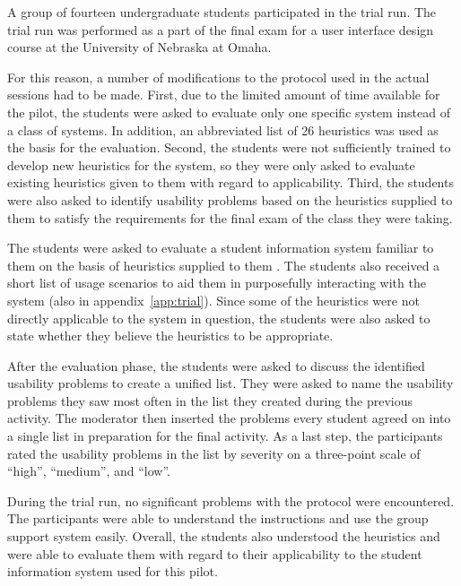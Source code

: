 A group of fourteen undergraduate students participated in the trial run. The trial run was performed as a part of the final exam for a user interface design course at the University of Nebraska at Omaha.

For this reason, a number of modifications to the protocol used in the actual sessions had to be made. First, due to the limited amount of time available for the pilot, the students were asked to evaluate only one specific system instead of a class of systems. In addition, an abbreviated list of 26 heuristics was used as the basis for the evaluation. Second, the students were not sufficiently trained to develop new heuristics for the system, so they were only asked to evaluate existing heuristics given to them with regard to applicability. Third, the students were also asked to identify usability problems based on the heuristics supplied to them to satisfy the requirements for the final exam of the class they were taking.

The students were asked to evaluate a student information system familiar to them on the basis of heuristics supplied to them \citep[a modified version of the set developed by][see appendix~\ref{app:trial}]{Oztekin2010}. The students also received a short list of usage scenarios to aid them in purposefully interacting with the system (also in appendix~\ref{app:trial}). Since some of the heuristics were not directly applicable to the system in question, the students were also asked to state whether they believe the heuristics to be appropriate.

After the evaluation phase, the students were asked to discuss the identified usability problems to create a unified list. They were asked to name the usability problems they saw most often in the list they created during the previous activity. The moderator then inserted the problems every student agreed on into a single list in preparation for the final activity. As a last step, the participants rated the usability problems in the list by severity on a three-point scale of ``high'', ``medium'', and ``low''.

During the trial run, no significant problems with the protocol were encountered. The participants were able to understand the instructions and use the group support system easily. Overall, the students also understood the heuristics and were able to evaluate them with regard to their applicability to the student information system used for this pilot.


